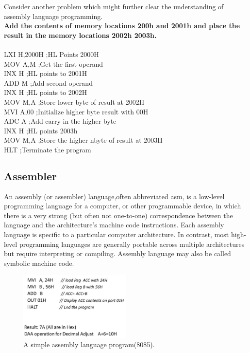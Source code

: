 \documentclass[12pt]{article}
\begin{document}
Consider another problem which might further clear the understanding of assembly language programming.\\
\textbf{Add the contents of memory locations 200h and 2001h and place the
result in the memory locations 2002h 2003h.}\\\\
LXI H,2000H     ;HL Points 2000H\\
MOV A,M         ;Get the first operand\\
INX H           ;HL points to 2001H\\
ADD M           ;Add second operand\\
INX H           ;HL points to 2002H\\
MOV M,A         ;Store lower byte of result at 2002H\\
MVI A,00        ;Initialize higher byte result with 00H\\
ADC A           ;Add carry in the higher byte\\
INX H           ;HL points 2003h\\
MOV M,A         ;Store the higher nbyte of result at 2003H\\
HLT             ;Terminate the program\\
        




\subsection{Assembler}
An assembly (or assembler) language,often abbreviated asm, is a low-level programming language for a computer, or other programmable device, in which there is a very strong (but often not one-to-one) correspondence between the language and the architecture's machine code instructions. Each assembly language is specific to a particular computer architecture. In contrast, most high-level programming languages are generally portable across multiple architectures but require interpreting or compiling. Assembly language may also be called symbolic machine code.
\begin{figure}[!htb]
\centering
\includegraphics[width=0.5\textwidth]{asmu.png}
\caption{\label{fig:simple_asm} A simple assembly language program(8085).}
\end{figure}
\end{document}
